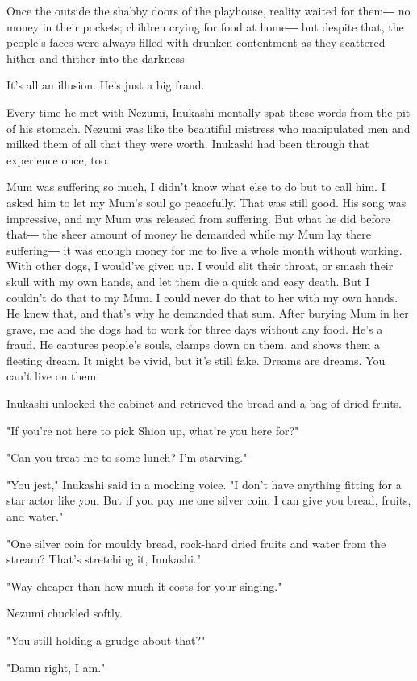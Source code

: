 Once the outside the shabby doors of the playhouse, reality waited for
them― no money in their pockets; children crying for food at home― but
despite that, the people's faces were always filled with drunken
contentment as they scattered hither and thither into the darkness.

It's all an illusion. He's just a big fraud.

Every time he met with Nezumi, Inukashi mentally spat these words from
the pit of his stomach. Nezumi was like the beautiful mistress who
manipulated men and milked them of all that they were worth. Inukashi
had been through that experience once, too.

Mum was suffering so much, I didn't know what else to do but to call
him. I asked him to let my Mum's soul go peacefully. That was still
good. His song was impressive, and my Mum was released from suffering.
But what he did before that― the sheer amount of money he demanded while
my Mum lay there suffering― it was enough money for me to live a whole
month without working. With other dogs, I would've given up. I would
slit their throat, or smash their skull with my own hands, and let them
die a quick and easy death. But I couldn't do that to my Mum. I could
never do that to her with my own hands. He knew that, and that's why he
demanded that sum. After burying Mum in her grave, me and the dogs had
to work for three days without any food. He's a fraud. He captures
people's souls, clamps down on them, and shows them a fleeting dream. It
might be vivid, but it's still fake. Dreams are dreams. You can't live
on them.

Inukashi unlocked the cabinet and retrieved the bread and a bag of dried
fruits.

"If you're not here to pick Shion up, what're you here for?"

"Can you treat me to some lunch? I'm starving."

"You jest," Inukashi said in a mocking voice. "I don't have anything
fitting for a star actor like you. But if you pay me one silver coin, I
can give you bread, fruits, and water."

"One silver coin for mouldy bread, rock-hard dried fruits and water from
the stream? That's stretching it, Inukashi."

"Way cheaper than how much it costs for your singing."

Nezumi chuckled softly.

"You still holding a grudge about that?"

"Damn right, I am."

